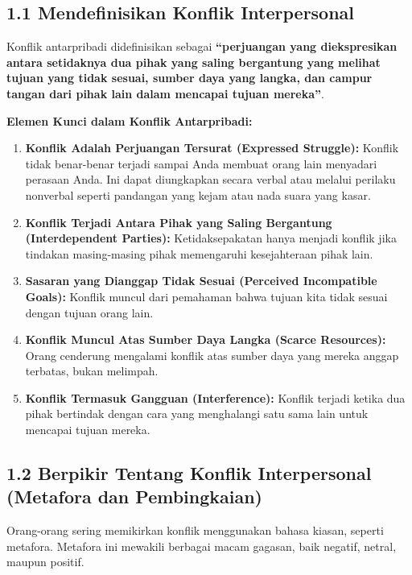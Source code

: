 \documentclass[
  letterpaper,
  DIV=11,
  numbers=noendperiod]{scrreprt}
\providecommand{\tightlist}{%
  \setlength{\itemsep}{0pt}\setlength{\parskip}{0pt}}
\begin{document}
\subsection{1.1 Mendefinisikan Konflik
Interpersonal}\label{mendefinisikan-konflik-interpersonal}

Konflik antarpribadi didefinisikan sebagai \textbf{``perjuangan yang
diekspresikan antara setidaknya dua pihak yang saling bergantung yang
melihat tujuan yang tidak sesuai, sumber daya yang langka, dan campur
tangan dari pihak lain dalam mencapai tujuan mereka''}.

\textbf{Elemen Kunci dalam Konflik Antarpribadi:}

\begin{enumerate}
\def\labelenumi{\arabic{enumi}.}
\tightlist
\item
  \textbf{Konflik Adalah Perjuangan Tersurat (Expressed Struggle):}
  Konflik tidak benar-benar terjadi sampai Anda membuat orang lain
  menyadari perasaan Anda. Ini dapat diungkapkan secara verbal atau
  melalui perilaku nonverbal seperti pandangan yang kejam atau nada
  suara yang kasar.
\item
  \textbf{Konflik Terjadi Antara Pihak yang Saling Bergantung
  (Interdependent Parties):} Ketidaksepakatan hanya menjadi konflik jika
  tindakan masing-masing pihak memengaruhi kesejahteraan pihak lain.
\item
  \textbf{Sasaran yang Dianggap Tidak Sesuai (Perceived Incompatible
  Goals):} Konflik muncul dari pemahaman bahwa tujuan kita tidak sesuai
  dengan tujuan orang lain.
\item
  \textbf{Konflik Muncul Atas Sumber Daya Langka (Scarce Resources):}
  Orang cenderung mengalami konflik atas sumber daya yang mereka anggap
  terbatas, bukan melimpah.
\item
  \textbf{Konflik Termasuk Gangguan (Interference):} Konflik terjadi
  ketika dua pihak bertindak dengan cara yang menghalangi satu sama lain
  untuk mencapai tujuan mereka.
\end{enumerate}

\subsection{1.2 Berpikir Tentang Konflik Interpersonal (Metafora dan
Pembingkaian)}\label{berpikir-tentang-konflik-interpersonal-metafora-dan-pembingkaian}

Orang-orang sering memikirkan konflik menggunakan bahasa kiasan, seperti
metafora. Metafora ini mewakili berbagai macam gagasan, baik negatif,
netral, maupun positif.
\end{document}
